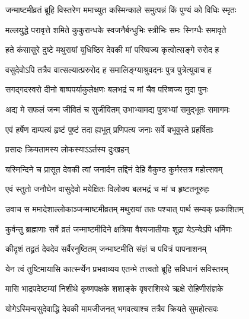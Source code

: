 \begingroup
\setlength{\parindent}{0pt}

\twolineshloka
{जन्माष्टमीव्रतं ब्रूहि विस्तरेण ममाच्युत}
{कस्मिन्काले समुत्पन्नं किं पुण्यं को विधिः स्मृतः}%

\twolineshloka
{मल्लयुद्धे परावृत्ते शमिते कुकुरान्धके}
{स्वजनैर्बन्धुभिः स्त्रीभिः समः स्निग्धैः समावृते}%

\twolineshloka
{हते कंसासुरे दुष्टे मथुरायां युधिष्ठिर}
{देवकी मां परिष्वज्य कृत्वोत्सङ्गे रुरोद ह}%

\twolineshloka
{वसुदेवोऽपि तत्रैव वात्सल्यात्प्ररुरोद ह}
{समालिङ्ग्याश्रुवदनः पुत्र पुत्रेत्युवाच ह}%

\twolineshloka
{सगद्गदस्वरो दीनो बाष्पपर्याकुलेक्षणः}
{बलभद्रं च मां चैव परिष्वज्य मुदा पुनः}%

\twolineshloka
{अद्य मे सफलं जन्म जीवितं च सुजीवितम्}
{उभाभ्यामद्य पुत्राभ्यां समुद्भूतः समागमः}%

\twolineshloka
{एवं हर्षेण दाम्पत्यं हृष्टं पुष्टं तदा ह्यभूत्}
{प्रणिपत्य जनाः सर्वे बभूवुस्ते प्रहर्षिताः}%

\onelineshloka
{प्रसादः क्रियतामस्य लोकस्याऽऽर्तस्य दुःखहन्}%

\twolineshloka
{यस्मिन्दिने च प्रासूत देवकी त्वां जनार्दन}
{तद्दिनं देहि वैकुण्ठ कुर्मस्तत्र महोत्सवम्}%

\twolineshloka
{एवं स्तुतो जनौघेन वासुदेवो मयेक्षितः}
{विलोक्य बलभद्रं च मां च हृष्टतनूरुहः}%

\twolineshloka
{उवाच स ममादेशाल्लोकाञ्जन्माष्टमीव्रतम्}
{मथुरायां ततः पश्चात् पार्थ सम्यक् प्रकाशितम्}%

\twolineshloka
{कुर्वन्तु ब्राह्मणाः सर्वे व्रतं जन्माष्टमीदिने}
{क्षत्रिया वैश्यजातीयाः शूद्रा येऽन्येऽपि धर्मिणः}%

\twolineshloka
{कीदृशं तद्व्रतं देवदेव सर्वैरनुष्ठितम्}
{जन्माष्टमीति संज्ञं च पवित्रं पापनाशनम्}%

\twolineshloka
{येन त्वं तुष्टिमायासि कार्त्स्न्येन प्रभवाव्यय}
{एतन्मे तत्त्वतो ब्रूहि सविधानं सविस्तरम्}%

\twolineshloka
{मासि भाद्रपदेष्टम्यां निशीथे कृष्णपक्षके}
{शशाङ्के वृषराशिस्थे ऋक्षे रोहिणीसंज्ञके}%

\twolineshloka
{योगेऽस्मिन्वसुदेवाद्धि देवकी मामजीजनत्}
{भगवत्याश्च तत्रैव क्रियते सुमहोत्सवः}%


